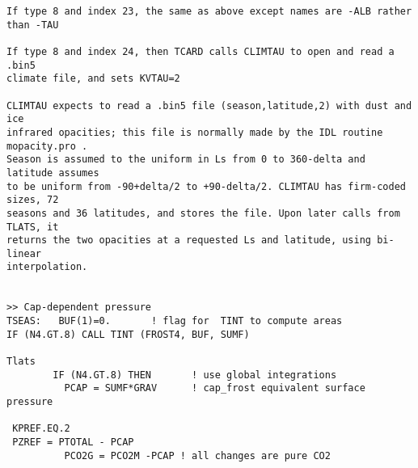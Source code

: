 \begin{verbatim}
If type 8 and index 23, the same as above except names are -ALB rather than -TAU

If type 8 and index 24, then TCARD calls CLIMTAU to open and read a .bin5 
climate file, and sets KVTAU=2

CLIMTAU expects to read a .bin5 file (season,latitude,2) with dust and ice
infrared opacities; this file is normally made by the IDL routine mopacity.pro .
Season is assumed to the uniform in Ls from 0 to 360-delta and latitude assumes
to be uniform from -90+delta/2 to +90-delta/2. CLIMTAU has firm-coded sizes, 72
seasons and 36 latitudes, and stores the file. Upon later calls from TLATS, it
returns the two opacities at a requested Ls and latitude, using bi-linear
interpolation.


>> Cap-dependent pressure
TSEAS:   BUF(1)=0.       ! flag for  TINT to compute areas
IF (N4.GT.8) CALL TINT (FROST4, BUF, SUMF)

Tlats
        IF (N4.GT.8) THEN       ! use global integrations
          PCAP = SUMF*GRAV      ! cap_frost equivalent surface pressure

 KPREF.EQ.2
 PZREF = PTOTAL - PCAP
          PCO2G = PCO2M -PCAP ! all changes are pure CO2

\end{verbatim}